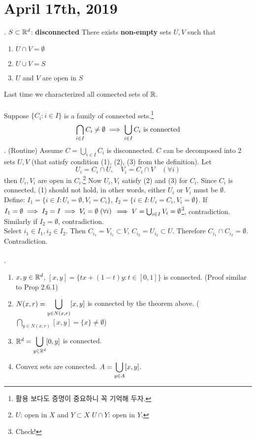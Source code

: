 \section*{April 17th, 2019}
. $S\subset \mathbb{R}^d$: \textbf{disconnected} \miff There exists \textbf{non-empty} sets $U, V$ such that \begin{enumerate}
	\item $U\cap V = \emptyset$
	\item $U\cup V = S$
	\item $U$ and $V$ are open in $S$\\
\end{enumerate}
Last time we characterized all connected sets of $\mathbb{R}$.\\
\\
 Suppose $\{C_i: i\in I\}$ is a family of connected sets.\footnote{활용 보다도 증명이 중요하니 꼭 기억해 두자.}
$$\bigcap_{i\in I} C_i \neq \emptyset \implies \bigcup_{i\in I} C_i  \text{ is connected}$$
\pf. (Routine) Assume $C = \bigcup_{i\in I} C_i$ is disconnected. $C$ can be decomposed into 2 sets $U, V$ (that satisfy condition (1), (2), (3) from the definition). Let $$U_i = C_i\cap U, \quad V_i = C_i\cap V \quad (\forall i)$$ then $U_i, V_i$ are open in $C_i$.\footnote{$U$: open in $X$ and $Y\subset X$ \mimp $U\cap Y$: open in $Y$.} Now $U_i, V_i$ satisfy (2) and (3) for $C_i$. Since $C_i$ is connected, (1) should not hold, in other words, either $U_i$ or $V_i$ must be $\emptyset$.\\
Define: $I_1 = \{i\in I:U_i = \emptyset, V_i =C_i \}$, $I_2 = \{i\in I:U_i =C_i, V_i = \emptyset \}$. If $I_1 = \emptyset \implies I_2 = I \implies V_i = \emptyset\; (\forall i)$ $\implies V = \bigcup_{i\in I} V_i = \emptyset$\footnote{Check!}, contradiction. Similarly if $I_2 = \emptyset$, contradiction.\\
Select $i_1 \in I_1, i_2 \in I_2$. Then $C_{i_1} = V_{i_1} \subset V$, $C_{i_2} = U_{i_2}\subset U$. Therefore $C_{i_1}\cap C_{i_2} = \emptyset$. Contradiction.\\
\\
\ex.
\begin{enumerate}
	\item $x, y\in \mathbb{R}^d$, $[x, y] = \{tx+(1-t)y: t\in[0, 1]\}$ is connected. (Proof similar to Prop 2.6.1)
	\item $\displaystyle N(x, r) = \bigcup_{y\in N(x, r)} [x, y]$ is connected by the theorem above. ($\bigcap_{y\in N(x, r)}[x, y] = \{x\} \neq \emptyset$)
	\item $\mathbb{R}^d = \displaystyle \bigcup_{y\in \mathbb{R}^d} [0, y]$ is connected.
	\item Convex sets are connected. $A = \displaystyle\bigcup_{y\in A}[x, y]$.
\end{enumerate}
